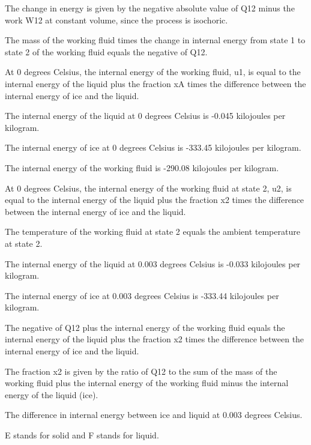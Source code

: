 The change in energy is given by the negative absolute value of Q12 minus the work W12 at constant volume, since the process is isochoric.

The mass of the working fluid times the change in internal energy from state 1 to state 2 of the working fluid equals the negative of Q12.

At 0 degrees Celsius, the internal energy of the working fluid, u1, is equal to the internal energy of the liquid plus the fraction xA times the difference between the internal energy of ice and the liquid.

The internal energy of the liquid at 0 degrees Celsius is -0.045 kilojoules per kilogram.

The internal energy of ice at 0 degrees Celsius is -333.45 kilojoules per kilogram.

The internal energy of the working fluid is -290.08 kilojoules per kilogram.

At 0 degrees Celsius, the internal energy of the working fluid at state 2, u2, is equal to the internal energy of the liquid plus the fraction x2 times the difference between the internal energy of ice and the liquid.

The temperature of the working fluid at state 2 equals the ambient temperature at state 2.

The internal energy of the liquid at 0.003 degrees Celsius is -0.033 kilojoules per kilogram.

The internal energy of ice at 0.003 degrees Celsius is -333.44 kilojoules per kilogram.

The negative of Q12 plus the internal energy of the working fluid equals the internal energy of the liquid plus the fraction x2 times the difference between the internal energy of ice and the liquid.

The fraction x2 is given by the ratio of Q12 to the sum of the mass of the working fluid plus the internal energy of the working fluid minus the internal energy of the liquid (ice).

The difference in internal energy between ice and liquid at 0.003 degrees Celsius.

E stands for solid and F stands for liquid.